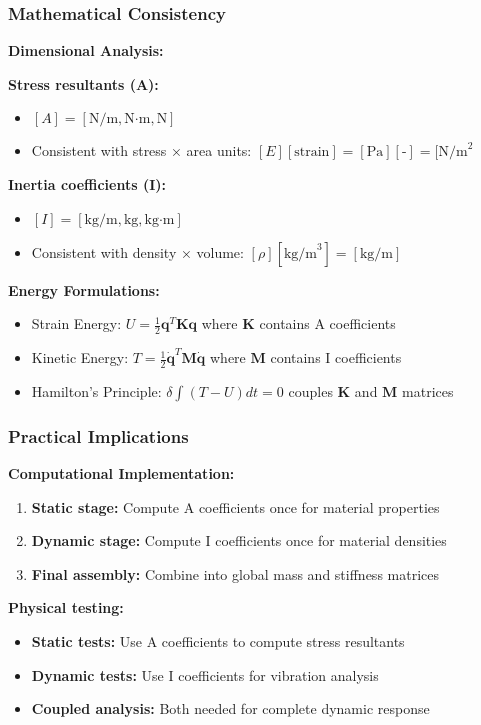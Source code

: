 \documentclass[12pt,a4paper]{article}
\begin{document}
\subsubsection{Mathematical Consistency}

\textbf{Dimensional Analysis:}

\textbf{Stress resultants (A):}
\begin{itemize}
\item $[A] = [\text{N/m}, \text{N·m}, \text{N}]$
\item Consistent with stress × area units: $[E][\text{strain}] = [\text{Pa}][\text{-}] = [\text{N/m}^2$
\end{itemize}

\textbf{Inertia coefficients (I):}
\begin{itemize}
\item $[I] = [\text{kg/m}, \text{kg}, \text{kg·m}]$
\item Consistent with density × volume: $[\rho][\text{kg/m}^3] = [\text{kg/m}]$
\end{itemize}

\textbf{Energy Formulations:}
\begin{itemize}
\item Strain Energy: $U = \frac{1}{2}\mathbf{q}^T\mathbf{K}\mathbf{q}$ where $\mathbf{K}$ contains A coefficients
\item Kinetic Energy: $T = \frac{1}{2}\dot{\mathbf{q}}^T\mathbf{M}\dot{\mathbf{q}}$ where $\mathbf{M}$ contains I coefficients
\item Hamilton's Principle: $\delta\int(T-U)dt = 0$ couples $\mathbf{K}$ and $\mathbf{M}$ matrices
\end{itemize}

\subsubsection{Practical Implications}

\textbf{Computational Implementation:}
\begin{enumerate}
\item \textbf{Static stage:} Compute A coefficients once for material properties
\item \textbf{Dynamic stage:} Compute I coefficients once for material densities
\item \textbf{Final assembly:} Combine into global mass and stiffness matrices
\end{enumerate}

\textbf{Physical testing:}
\begin{itemize}
\item \textbf{Static tests:} Use A coefficients to compute stress resultants
\item \textbf{Dynamic tests:} Use I coefficients for vibration analysis
\item \textbf{Coupled analysis:} Both needed for complete dynamic response
\end{itemize}
\end{document}
